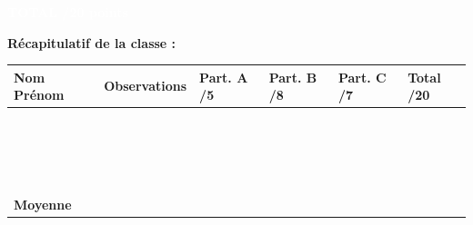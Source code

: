 \documentclass[10pt,a4paper]{article}
\begin{document}
\vspace{6mm}

\noindent\colorbox{grandtotal}{%
  \parbox{\dimexpr\linewidth-2\fboxsep\relax}{%
    \textcolor{white}{\textbf{\Large \hfill TOTAL \hfill /20 points \hfill}}%
  }%
}

\vspace{6mm}

\noindent\textbf{Récapitulatif de la classe :}

\vspace{2mm}

\begin{tabularx}{\linewidth}{|>{\centering\arraybackslash}p{4.5cm}|>{\centering\arraybackslash}X|>{\centering\arraybackslash}p{1.8cm}|>{\centering\arraybackslash}p{1.8cm}|>{\centering\arraybackslash}p{1.8cm}|>{\centering\arraybackslash}p{1.8cm}|}
  \hline
  \rowcolor{exolight}
  \textbf{Nom Prénom} & \textbf{Observations} & \textbf{Part. A /5} & \textbf{Part. B /8} & \textbf{Part. C /7} & \textbf{Total /20} \\
  \hline
  & & & & & \\[5mm] \hline
  & & & & & \\[5mm] \hline
  & & & & & \\[5mm] \hline
  & & & & & \\[5mm] \hline
  & & & & & \\[5mm] \hline
  & & & & & \\[5mm] \hline
  & & & & & \\[5mm] \hline
  & & & & & \\[5mm] \hline
  & & & & & \\[5mm] \hline
  & & & & & \\[5mm] \hline
  & & & & & \\[5mm] \hline
  & & & & & \\[5mm] \hline
  & & & & & \\[5mm] \hline
  & & & & & \\[5mm] \hline
  & & & & & \\[5mm] \hline
  & & & & & \\[5mm] \hline
  & & & & & \\[5mm] \hline
  & & & & & \\[5mm] \hline
  \rowcolor{totalrow}
  \textbf{Moyenne} & & & & & \\
  \hline
\end{tabularx}
\end{document}
